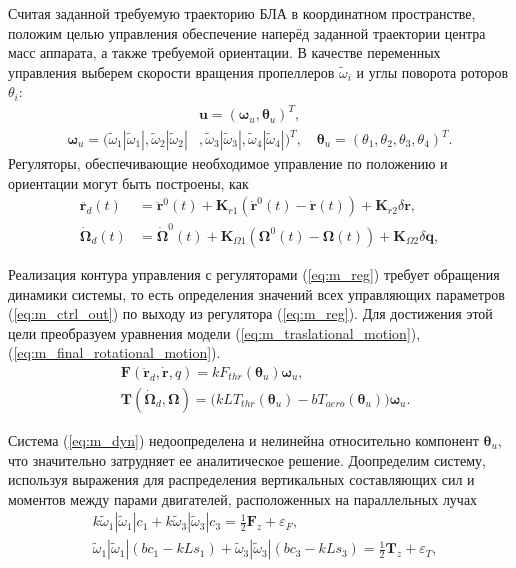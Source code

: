 Считая заданной требуемую траекторию БЛА в координатном пространстве, положим целью управления обеспечение наперёд заданной траектории центра масс аппарата, а также требуемой ориентации. В качестве переменных управления выберем скорости вращения пропеллеров ${\tilde \omega}_i$ и углы поворота роторов ${\theta}_i$:
\begin{equation} \label{eq:m_ctrl_out}
\begin{aligned}
&\bm{u} = (\bm \omega_u, \bm \theta_u)^T,
\\
\bm \omega_u =
(\tilde\omega_1 |\tilde\omega_1|,
\tilde\omega_2 |\tilde\omega_2|&,
\tilde\omega_3 |\tilde\omega_3|,
\tilde\omega_4 |\tilde\omega_4|)^T,
\quad
\bm \theta_u = (\theta_1, \theta_2 , \theta_3 , \theta_4 )^T.
\end{aligned}
\end{equation}
Регуляторы, обеспечивающие необходимое управление по положению и ориентации могут быть построены, как
\begin{equation} \label{eq:m_reg}
\begin{aligned}
\ddot{\bm{r}_d}(t)&=
\ddot{\bm{r}}^0(t)+\bm{K}_{r1}(\dot{\bm{r}}^0(t) - \dot{\bm{r}}(t))+\bm{K}_{r2}\delta \bm r,\\
\dot{\bm{\Omega}}_d(t)&=
\dot{\bm{\Omega}}^0(t)+\bm{K}_{\Omega1}(\bm{\Omega}^0(t)-\bm{\Omega}(t))+\bm{K}_{\Omega2}\delta\bm{q},
\end{aligned}
\end{equation}

Реализация контура управления с регуляторами (\ref{eq:m_reg}) требует обращения динамики системы, то есть определения значений всех управляющих параметров (\ref{eq:m_ctrl_out}) по выходу из регулятора (\ref{eq:m_reg}).
Для достижения этой цели преобразуем уравнения модели (\ref{eq:m_traslational_motion}), (\ref{eq:m_final_rotational_motion}).
\begin{equation} \label{eq:m_dyn}
\begin{aligned}
&\bm F(\ddot{\bm r}_d, \dot{\bm r}, q) = k F_{thr} (\bm \theta_u) \bm \omega_u,\\
&\bm T(\dot{\bm \Omega}_d, \bm\Omega) = \Big(
kLT_{thr}(\bm\theta_u) - bT_{aero}(\bm\theta_u)
\Big)
\bm \omega_u.
\end{aligned}
\end{equation}

Система (\ref{eq:m_dyn}) недоопределена и нелинейна относительно компонент $\bm \theta_u$, что значительно затрудняет ее аналитическое решение. Доопределим систему, используя выражения для распределения вертикальных составляющих сил и моментов между парами двигателей, расположенных на параллельных лучах
\begin{equation} \label{eq:m_dyn_balance_1}
\begin{aligned}
&k \tilde\omega_1 |\tilde\omega_1| c_1 + k \tilde\omega_3 |\tilde\omega_3| c_3 =
\frac{1}{2} \bm F_z + \varepsilon_F,
\\
&\tilde\omega_1 |\tilde\omega_1| (bc_1 - kLs_1)
+ \tilde\omega_3 |\tilde\omega_3| (bc_3 - kLs_3) =
\frac{1}{2} \bm T_z + \varepsilon_T,
\end{aligned}
\end{equation}

